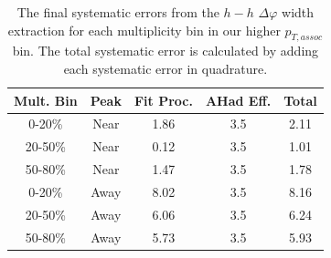 \documentclass[ALICE,manyauthors]{ALICE_analysis_notes}
\begin{document}
\begin{table}[ht]
\centering
\begin{tabular}{|c|c||c|c||c|}
\hline
Mult. Bin & Peak & Fit Proc. & AHad Eff. & Total \\
\hline

0-20\% & Near & 1.86 & 3.5 & 2.11 \\
20-50\% & Near & 0.12 & 3.5 & 1.01 \\
50-80\% & Near & 1.47 & 3.5 & 1.78 \\
0-20\% & Away & 8.02 & 3.5 & 8.16 \\
20-50\% & Away & 6.06 & 3.5 & 6.24 \\
50-80\% & Away & 5.73 & 3.5 & 5.93 \\

\hline
\end{tabular}
\caption{The final systematic errors from the $h-h$ $\Delta\varphi$ width extraction  for each multiplicity bin in our higher $p_{T, assoc}$ bin. The total systematic error is calculated by adding each systematic error in quadrature.}
\label{h_h_width_systematic_table_highpt}
\end{table}
\end{document}
